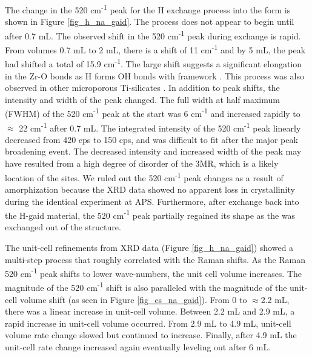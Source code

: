 \documentclass[journal=acsodf,manuscript=article]{achemso}
\begin{document}
The change in the 520 cm\textsuperscript{-1}  peak for the H exchange
process into the  form is shown in
Figure {\ref{fig_h_na_gaid}}. The process does not appear to
begin until after 0.7 mL. The observed shift in the 520
cm\textsuperscript{-1} peak during exchange is rapid. From volumes 0.7
mL to 2 mL, there is a shift of 11 cm\textsuperscript{-1} and by 5 mL,
the peak had shifted a total of 15.9 cm\textsuperscript{-1}. The large
shift suggests a significant elongation in the Zr-O bonds as H
forms OH bonds with framework .  This process was
also observed in other microporous Ti-silicates \cite{Celestian2013}.  In
addition to peak shifts, the intensity and width of the peak changed. 
The full width at half maximum (FWHM) of the 520 cm\textsuperscript{-1 } peak at the start was 6
cm\textsuperscript{-1} and increased rapidly to \(\approx\) 22
cm\textsuperscript{-1} after 0.7 mL.  The integrated intensity of the
520 cm\textsuperscript{-1} peak linearly decreased from 420 cps to
150 cps, and was difficult to fit after the major peak broadening
event.  The decreased intensity and increased width of the peak may have
resulted from a high degree of disorder of the 3MR, which is a likely
location of the  sites.  We ruled out the 520
cm\textsuperscript{-1} peak changes as a result of amorphization because
the XRD data showed no apparent loss in crystallinity during the
identical experiment at APS.  Furthermore, after 
exchange back into the H-gaid material, the 520 cm\textsuperscript{-1}
peak partially regained its shape as the  was
exchanged out of the structure. 

 

The unit-cell refinements from XRD data
(Figure {\ref{fig_h_na_gaid}}) showed a multi-step process
that roughly correlated with the Raman shifts.  As the Raman 520
cm\textsuperscript{-1} peak shifts to lower wave-numbers, the unit cell
volume increases.  The magnitude of the 520 cm\textsuperscript{-1} shift
is also paralleled with the magnitude of the unit-cell volume shift (as
seen in Figure {\ref{fig_cs_na_gaid}}).  From 0
to \(\approx\)2.2 mL, there was a linear increase in unit-cell
volume.  Between 2.2 mL and 2.9 mL, a rapid increase in unit-cell volume
occurred.  From 2.9 mL to 4.9 mL, unit-cell volume rate change slowed
but continued to increase.  Finally, after 4.9 mL the unit-cell rate
change increased again eventually leveling out after 6 mL.   

 
\end{document}
